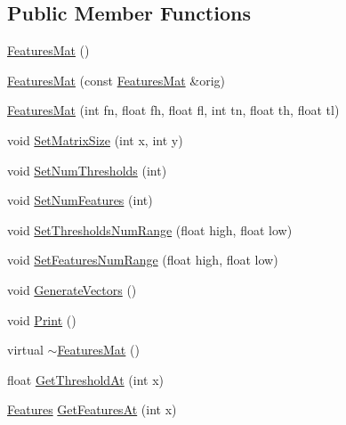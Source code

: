 \subsection*{Public Member Functions}
\begin{DoxyCompactItemize}
\item 
\hyperlink{classrdf_1_1bpc_1_1FeaturesMat_a97d121d34349bf2c59b94c2048cf8543}{Features\+Mat} ()
\item 
\hyperlink{classrdf_1_1bpc_1_1FeaturesMat_abc3e95ccbc49b66cd506496985ca8fb0}{Features\+Mat} (const \hyperlink{classrdf_1_1bpc_1_1FeaturesMat}{Features\+Mat} \&orig)
\item 
\hyperlink{classrdf_1_1bpc_1_1FeaturesMat_a4656343c72c85949ef2e13d01f4b0bbf}{Features\+Mat} (int fn, float fh, float fl, int tn, float th, float tl)
\item 
void \hyperlink{classrdf_1_1bpc_1_1FeaturesMat_a14292e637f99011c2f519f938acf89c6}{Set\+Matrix\+Size} (int x, int y)
\item 
void \hyperlink{classrdf_1_1bpc_1_1FeaturesMat_a4d975d667769356abb6ef91a379fbe38}{Set\+Num\+Thresholds} (int)
\item 
void \hyperlink{classrdf_1_1bpc_1_1FeaturesMat_abb8b176b7082837f435b66e79802114d}{Set\+Num\+Features} (int)
\item 
void \hyperlink{classrdf_1_1bpc_1_1FeaturesMat_a03f0951ab28c3f8056eafb5c76412519}{Set\+Thresholds\+Num\+Range} (float high, float low)
\item 
void \hyperlink{classrdf_1_1bpc_1_1FeaturesMat_a46e93bc1f4714aa57bee42d7e1da35fd}{Set\+Features\+Num\+Range} (float high, float low)
\item 
void \hyperlink{classrdf_1_1bpc_1_1FeaturesMat_aafcb6a653e6f4e161ca91b22710ff226}{Generate\+Vectors} ()
\item 
void \hyperlink{classrdf_1_1bpc_1_1FeaturesMat_a1c8094aad67feee40dfb71d325310e98}{Print} ()
\item 
virtual \hyperlink{classrdf_1_1bpc_1_1FeaturesMat_a5e01733c2446354d4dea3b149d74ce2a}{$\sim$\+Features\+Mat} ()
\item 
float \hyperlink{classrdf_1_1bpc_1_1FeaturesMat_a254007ddad6b1c1f1f91582b69a1957c}{Get\+Threshold\+At} (int x)
\item 
\hyperlink{classrdf_1_1bpc_1_1Features}{Features} \hyperlink{classrdf_1_1bpc_1_1FeaturesMat_a98330606d445ea0a8733ee308756e42f}{Get\+Features\+At} (int x)
\end{DoxyCompactItemize}
